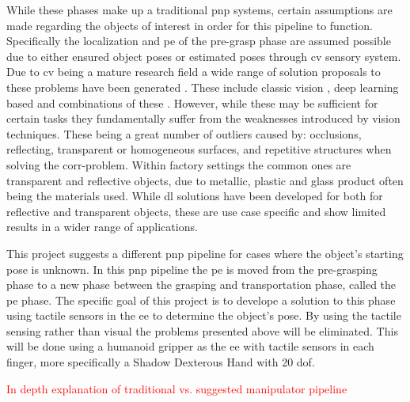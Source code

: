 While these phases make up a traditional \gls{pnp} systems, certain assumptions are made regarding the objects of interest in order for this pipeline to function. Specifically the localization and \gls{pe} of the pre-grasp phase are assumed possible due to either ensured object poses or estimated poses through \gls{cv} sensory system. Due to \gls{cv} being a mature research field a wide range of solution proposals to these problems have been generated \cite*{6d-pose-estimation-of-objects:-recent-technologies-and-challenges}. These include classic vision \cite*{3d-object-pose-estimation-using-stereo-vision-for-object-manipulation-system} \cite*{stereo-vision-based-automation-for-a-bin-picking-solution}, deep learning based \cite*{uncalibrated-stereo-vision-with-deep-learning-for-6-dof-pose-estimation-for-a-robot-arm-system} and combinations of these \cite*{stereo-vision-based-single-shot-6d-object-pose-estimation-for-bin-picking-by-a-robot-manipulator}. However, while these may be sufficient for certain tasks they fundamentally suffer from the weaknesses introduced by vision techniques. These being a great number of outliers caused by: occlusions, reflecting, transparent or homogeneous surfaces, and repetitive structures when solving the \gls{corr-problem}. Within factory settings the common ones are transparent and reflective objects, due to metallic, plastic and glass product often being the materials used. While \gls{dl} solutions have been developed for both for reflective \cite*{data-driven-object-pose-estimation-in-a-practical-bin-picking-application} and transparent \cite*{6dof-pose-estimation-of-transparent-object-from-a-single-rgb-d-image} objects, these are use case specific and show limited results in a wider range of applications. \medskip

This project suggests a different \gls{pnp} pipeline for cases where the object's starting pose is unknown. In this \gls{pnp} pipeline the \gls{pe} is moved from the pre-grasping phase to a new phase between the grasping and transportation phase, called the \gls{pe} phase. The specific goal of this project is to develope a solution to this phase using tactile sensors in the \gls{ee} to determine the object's pose. By using the tactile sensing rather than visual the problems presented above will be eliminated. This will be done using a humanoid gripper as the \gls{ee} with tactile sensors in each finger, more specifically a Shadow Dexterous Hand \cite{shadow-dex-hand} with 20 \gls{dof}. \medskip

\textcolor{red}{In depth explanation of traditional vs. suggested manipulator pipeline}

